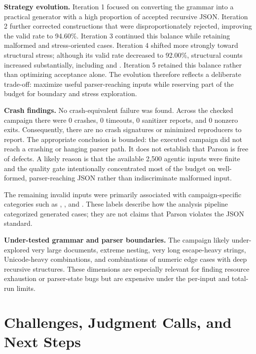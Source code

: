 \documentclass[10pt,a4paper]{article}
\begin{document}
\textbf{Strategy evolution.}
Iteration 1 focused on converting the grammar into a practical generator with a high proportion of accepted recursive JSON. Iteration 2
further corrected constructions that were disproportionately rejected, improving the valid rate to 94.60\%. Iteration 3 continued this
balance while retaining malformed and stress-oriented cases. Iteration 4 shifted more strongly toward structural stress; although its
valid rate decreased to 92.00\%, structural counts increased substantially, including  and
. Iteration 5 retained this balance rather than optimizing acceptance alone. The evolution therefore reflects
a deliberate trade-off: maximize useful parser-reaching inputs while reserving part of the budget for boundary and stress exploration.

\textbf{Crash findings.}
No crash-equivalent failure was found. Across the checked campaign there were 0 crashes, 0 timeouts, 0 sanitizer reports, and 0
nonzero exits. Consequently, there are no crash signatures or minimized reproducers to report. The appropriate conclusion is bounded:
the executed campaign did not reach a crashing or hanging parser path. It does not establish that Parson is free of defects. A likely
reason is that the available 2,500 agentic inputs were finite and the quality gate intentionally concentrated most of the budget on
well-formed, parser-reaching JSON rather than indiscriminate malformed input.

The remaining invalid inputs were primarily associated with campaign-specific categories such as
, , and . These labels describe how the
analysis pipeline categorized generated cases; they are not claims that Parson violates the JSON standard.

\textbf{Under-tested grammar and parser boundaries.}
The campaign likely under-explored very large documents, extreme nesting, very long escape-heavy strings, Unicode-heavy combinations,
and combinations of numeric edge cases with deep recursive structures. These dimensions are especially relevant for finding resource
exhaustion or parser-state bugs but are expensive under the per-input and total-run limits.

\section{Challenges, Judgment Calls, and Next Steps}
\end{document}

